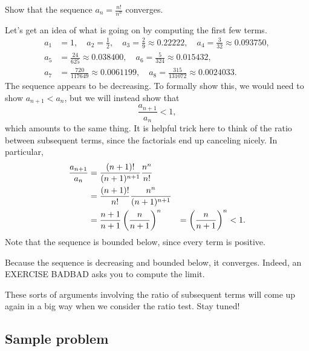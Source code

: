 \documentclass{ximera}
\begin{document}
\begin{example}
Show that the sequence $a_n = \frac{n!}{n^n}$ converges.
\end{example}

\begin{explanation}
  Let's get an idea of what is going on by computing the first few terms.
\begin{align*}
a_1&= 1,\quad a_2= \frac{1}{2},\quad a_3= \frac{2}{9} \approx 0.22222,\quad a_4= \frac{3}{32} \approx 0.093750, \\
a_5&= \frac{24}{625} \approx 0.038400, \quad a_6= \frac{5}{324} \approx 0.015432, \\
a_7&= \frac{720}{117649} \approx 0.0061199,\quad a_8= \frac{315}{131072} \approx 0.0024033.
\end{align*}
  The sequence appears to be decreasing.  To formally show this, we would need to show $a_{n+1}< a_n$, but we will instead show that
$$
\frac{a_{n+1}}{a_n} < 1,
$$
which amounts to the same thing.  It is helpful trick here to think of
the ratio between subsequent terms, since the factorials end up
canceling nicely.  In particular,
\begin{align*}
  {a_{n+1}\over a_n} &= {(n+1)!\over (n+1)^{n+1}}{n^n\over n!} \\
  &= {(n+1)!\over n!}{n^n\over (n+1)^{n+1}} \\
  &= {n+1\over n+1}\left({n\over n+1}\right)^n
  &= \left({n\over n+1}\right)^n < 1.
\end{align*}
  Note that the sequence is bounded below, since every term is positive.

  Because the sequence is decreasing and bounded below, it converges.
  Indeed, an EXERCISE BADBAD asks you to compute the limit.
\end{explanation}

These sorts of arguments involving the ratio of subsequent terms will
come up again in a big way when we consider the ratio test.  Stay
tuned!

\subsection{Sample problem}
\end{document}
